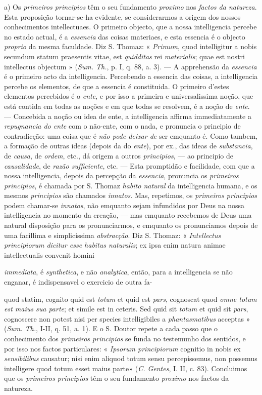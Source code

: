 a) Os \emph{primeiros principios} têm o seu fundamento \emph{proximo} nos \emph{factos da natureza}. Esta proposição tornar-se-ha evidente, se considerarmos a origem dos nossos conhecimentos intellectuaes. O primeiro objecto, que a nossa intelligencia percebe no estado actual, é a \emph{essencia} das coisas materiaes, e esta essencia é o objecto \emph{proprio} da mesma faculdade. Diz S. Thomaz: « \emph{Primum}, quod intelligitur a nobis secundum statum praesentis vitae, est \emph{quidditas} rei \emph{materialis}; quae est nostri intellectus objectum » (\emph{Sum. Th.}, p. I, q. 88, a. 3). --- A apprehensão da \emph{essencia} é o primeiro acto da intelligencia. Percebendo a essencia das coisas, a intelligencia percebe os elementos, de que a essencia é constituida. O primeiro d'estes elementos percebidos é o \emph{ente}, e por isso a primeira e universalissima noção, que está contida em todas as noções e em que todas se resolvem, é a noção de \emph{ente}. --- Concebida a noção ou idea de ente, a intelligencia affirma immediatamente a \emph{repugnancia do ente} com o não-ente, com o nada, e pronuncia o principio de contradicção: uma coisa que é \emph{não pode deixar de} ser emquanto é. Como tambem, a formação de outras ideas (depois da do \emph{ente}), por ex., das ideas de \emph{substancia}, de \emph{causa}, de \emph{ordem}, etc., dá origem a outros \emph{principios}, --- ao principio de \emph{causalidade}, de \emph{razão sufficiente}, etc. --- Esta promptidão e facilidade, com que a nossa intelligencia, depois da percepção da \emph{essencia}, pronuncia os \emph{primeiros principios}, é chamada por S. Thomaz \emph{habito natural} da intelligencia humana, e os mesmos \emph{principios} são chamados \emph{innatos}. Mas, repetimos, os \emph{primeiros principios} podem chamar-se \emph{innatos}, não emquanto sejam infundidos por Deus na nossa intelligencia no momento da creação, --- mas emquanto recebemos de Deus uma natural disposição para os pronunciarmos, e emquanto os pronunciamos depois de uma facillima e simplicissima \emph{abstracção}. Diz S. Thomaz: « \emph{Intellectus principiorum dicitur esse habitus naturalis}; ex ipsa enim natura animae intellectualis convenit homini

\emph{immediata}, é \emph{synthetica}, e não \emph{analytica}, então, para a intelligencia se não enganar, é indispensavel o exercicio de outra fa-

quod statim, cognito quid est \emph{totum} et quid est \emph{pars}, cognoscat quod \emph{omne totum est maius sua parte}; et simile est in ceteris. Sed quid sit \emph{totum} et quid sit \emph{pars}, cognoscere non potest nisi per species intelligibiles a \emph{phantasmatibus} acceptas » (\emph{Sum. Th.}, I-II, q. 51, a. 1). E o S. Doutor repete a cada passo que o conhecimento dos \emph{primeiros principios} se funda no testemunho dos sentidos, e por isso nos factos particulares: « \emph{Ipsorum principiorum} cognitio in nobis ex \emph{sensibilibus} causatur; nisi enim aliquod totum sensu percepissemus, non possemus intelligere quod totum esset maius parte» (\emph{C. Gentes}, I. II, c. 83). Concluimos que os \emph{primeiros principios} têm o seu fundamento \emph{proximo} nos factos da natureza.

